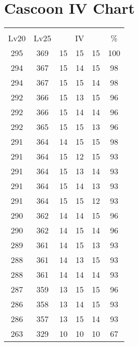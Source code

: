 \documentclass{article}%
\begin{document}
%
\normalsize%
\section{Cascoon IV Chart}%
\label{sec:Cascoon IV Chart}%
\renewcommand{\arraystretch}{1.5}%
\begin{tabular}{|c|c|c|c|c|c|}%
\hline%
\multicolumn{6}{|c|}{\textcolor{white}{ 
\linebreak{Cascoon}
}%
\cellcolor{black}}\\%
\multicolumn{1}{|c}{Lv20}&\multicolumn{1}{c|}{Lv25}&\multicolumn{3}{c|}{IV}&\multicolumn{1}{|c|}{\%}\\%
\hline%
\rowcolor{color100}%
295&369&15&15&15&100\\%
\hline%
\rowcolor{color98}%
294&367&15&14&15&98\\%
\hline%
\rowcolor{color98}%
294&367&15&15&14&98\\%
\hline%
\rowcolor{color96}%
292&366&15&13&15&96\\%
\hline%
\rowcolor{color96}%
292&366&15&14&14&96\\%
\hline%
\rowcolor{color96}%
292&365&15&15&13&96\\%
\hline%
\rowcolor{color98}%
291&364&14&15&15&98\\%
\hline%
\rowcolor{color93}%
291&364&15&12&15&93\\%
\hline%
\rowcolor{color93}%
291&364&15&13&14&93\\%
\hline%
\rowcolor{color93}%
291&364&15&14&13&93\\%
\hline%
\rowcolor{color93}%
291&364&15&15&12&93\\%
\hline%
\rowcolor{color96}%
290&362&14&14&15&96\\%
\hline%
\rowcolor{color96}%
290&362&14&15&14&96\\%
\hline%
\rowcolor{color93}%
289&361&14&15&13&93\\%
\hline%
\rowcolor{color93}%
288&361&14&13&15&93\\%
\hline%
\rowcolor{color93}%
288&361&14&14&14&93\\%
\hline%
\rowcolor{color96}%
287&359&13&15&15&96\\%
\hline%
\rowcolor{color93}%
286&358&13&14&15&93\\%
\hline%
\rowcolor{color93}%
286&357&13&15&14&93\\%
\hline%
\rowcolor{color91}%
263&329&10&10&10&67\\%
\end{tabular}

%
\end{document}
